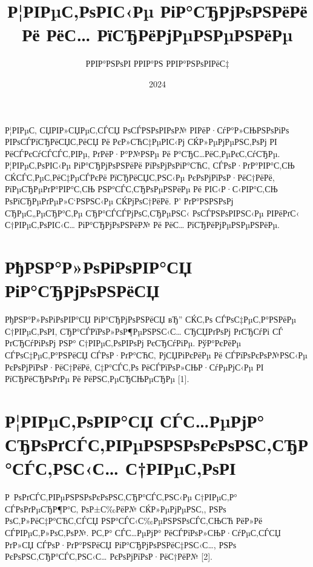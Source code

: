 \documentclass[referat, och, times]{SCWorks}
\begin{document}
	
	\title{Р¦РІРµС‚РѕРІС‹Рµ РіР°СЂРјРѕРЅРёРё Рё РёС… РїСЂРёРјРµРЅРµРЅРёРµ}
	\author{РРІР°РЅРѕРІ РРІР°РЅ РРІР°РЅРѕРІРёС‡}
	\date{2024}
	\maketitle
	
	\intro
	Р¦РІРµС‚ СЏРІР»СЏРµС‚СЃСЏ РѕСЃРЅРѕРІРѕР№ РІРёР·СѓР°Р»СЊРЅРѕРіРѕ РІРѕСЃРїСЂРёСЏС‚РёСЏ Рё РєР»СЋС‡РµРІС‹Рј СЌР»РµРјРµРЅС‚РѕРј РІ РёСЃРєСѓСЃСЃС‚РІРµ, РґРёР·Р°Р№РЅРµ Рё Р°СЂС…РёС‚РµРєС‚СѓСЂРµ. Р¦РІРµС‚РѕРІС‹Рµ РіР°СЂРјРѕРЅРёРё РїРѕРјРѕРіР°СЋС‚ СЃРѕР·РґР°РІР°С‚СЊ СЌСЃС‚РµС‚РёС‡РµСЃРєРё РїСЂРёСЏС‚РЅС‹Рµ РєРѕРјРїРѕР·РёС†РёРё, РїРµСЂРµРґР°РІР°С‚СЊ РЅР°СЃС‚СЂРѕРµРЅРёРµ Рё РІС‹Р·С‹РІР°С‚СЊ РѕРїСЂРµРґРµР»С‘РЅРЅС‹Рµ СЌРјРѕС†РёРё. Р’ РґР°РЅРЅРѕРј СЂРµС„РµСЂР°С‚Рµ СЂР°СЃСЃРјРѕС‚СЂРµРЅС‹ РѕСЃРЅРѕРІРЅС‹Рµ РІРёРґС‹ С†РІРµС‚РѕРІС‹С… РіР°СЂРјРѕРЅРёР№ Рё РёС… РїСЂРёРјРµРЅРµРЅРёРµ.
	
	\newpage
	
	\section{РђРЅР°Р»РѕРіРѕРІР°СЏ РіР°СЂРјРѕРЅРёСЏ}
	РђРЅР°Р»РѕРіРѕРІР°СЏ РіР°СЂРјРѕРЅРёСЏ вЂ” СЌС‚Рѕ СЃРѕС‡РµС‚Р°РЅРёРµ С†РІРµС‚РѕРІ, СЂР°СЃРїРѕР»РѕР¶РµРЅРЅС‹С… СЂСЏРґРѕРј РґСЂСѓРі СЃ РґСЂСѓРіРѕРј РЅР° С†РІРµС‚РѕРІРѕРј РєСЂСѓРіРµ. РўР°РєРёРµ СЃРѕС‡РµС‚Р°РЅРёСЏ СЃРѕР·РґР°СЋС‚ РјСЏРіРєРёРµ Рё СЃРїРѕРєРѕР№РЅС‹Рµ РєРѕРјРїРѕР·РёС†РёРё, С‡Р°СЃС‚Рѕ РёСЃРїРѕР»СЊР·СѓРµРјС‹Рµ РІ РїСЂРёСЂРѕРґРµ Рё РёРЅС‚РµСЂСЊРµСЂРµ [1].
	
	\section{Р¦РІРµС‚РѕРІР°СЏ СЃС…РµРјР° СЂРѕРґСЃС‚РІРµРЅРЅРѕРєРѕРЅС‚СЂР°СЃС‚РЅС‹С… С†РІРµС‚РѕРІ}
	Р РѕРґСЃС‚РІРµРЅРЅРѕРєРѕРЅС‚СЂР°СЃС‚РЅС‹Рµ С†РІРµС‚Р° СЃРѕРґРµСЂР¶Р°С‚ РѕР±С‰РёР№ СЌР»РµРјРµРЅС‚, РЅРѕ РѕС‚Р»РёС‡Р°СЋС‚СЃСЏ РЅР°СЃС‹С‰РµРЅРЅРѕСЃС‚СЊСЋ РёР»Рё СЃРІРµС‚Р»РѕС‚РѕР№. Р­С‚Р° СЃС…РµРјР° РёСЃРїРѕР»СЊР·СѓРµС‚СЃСЏ РґР»СЏ СЃРѕР·РґР°РЅРёСЏ РіР°СЂРјРѕРЅРёС‡РЅС‹С…, РЅРѕ РєРѕРЅС‚СЂР°СЃС‚РЅС‹С… РєРѕРјРїРѕР·РёС†РёР№ [2].
	
\end{document}
